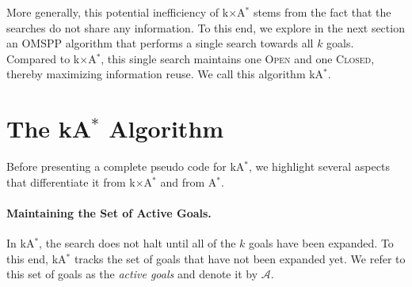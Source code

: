 \documentclass[smallextended]{svjour3}       %
\newcommand{\omspp}{\ac{OMSPP}\xspace}
\newcommand{\astar}{A$^*$\xspace}
\newcommand{\kastar}{kA$^*$\xspace}
\newcommand{\kxastar}{k$\times$A$^*$\xspace}
\newcommand{\open}{\textsc{Open}\xspace}
\newcommand{\closed}{\textsc{Closed}\xspace}
\newcommand{\activeg}{\mathcal{A}}
\begin{document}
More generally, this potential inefficiency of \kxastar stems from the fact that the searches do not share any information. To this end, we explore in the next section an \omspp algorithm that performs a single search towards all $k$ goals. Compared to \kxastar, this single search maintains one  \open and one \closed, thereby maximizing information reuse. We call this algorithm \kastar. 



\section{The \kastar Algorithm}
\label{sec:one-k-goal-search}

Before presenting a complete pseudo code for \kastar, we highlight several aspects that differentiate it from \kxastar and from \astar.

\paragraph{Maintaining the Set of Active Goals.}
In \kastar, the search does not halt until all of the $k$ goals have been expanded. 
To this end, \kastar tracks the set of goals that have not been expanded yet. We refer to this set of goals as the \emph{active goals} and denote it by $\activeg$.

\end{document}
